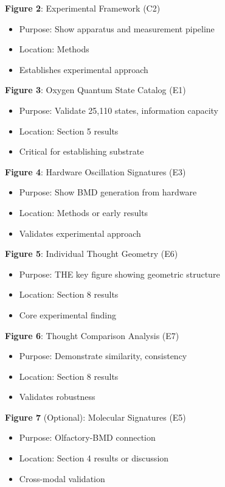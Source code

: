\documentclass[11pt]{article}
\begin{document}
\textbf{Figure 2}: Experimental Framework (C2)
\begin{itemize}
\item Purpose: Show apparatus and measurement pipeline
\item Location: Methods
\item Establishes experimental approach
\end{itemize}

\textbf{Figure 3}: Oxygen Quantum State Catalog (E1)
\begin{itemize}
\item Purpose: Validate 25,110 states, information capacity
\item Location: Section 5 results
\item Critical for establishing  substrate
\end{itemize}

\textbf{Figure 4}: Hardware Oscillation Signatures (E3)
\begin{itemize}
\item Purpose: Show BMD generation from hardware
\item Location: Methods or early results
\item Validates experimental approach
\end{itemize}

\textbf{Figure 5}: Individual Thought Geometry (E6)
\begin{itemize}
\item Purpose: THE key figure showing geometric structure
\item Location: Section 8 results
\item Core experimental finding
\end{itemize}

\textbf{Figure 6}: Thought Comparison Analysis (E7)
\begin{itemize}
\item Purpose: Demonstrate similarity, consistency
\item Location: Section 8 results
\item Validates robustness
\end{itemize}

\textbf{Figure 7} (Optional): Molecular Signatures (E5)
\begin{itemize}
\item Purpose: Olfactory-BMD connection
\item Location: Section 4 results or discussion
\item Cross-modal validation
\end{itemize}
\end{document}
